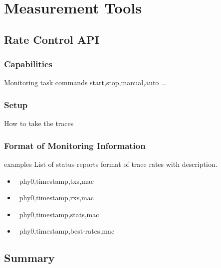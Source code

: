 \chapter{Measurement Tools}
\label{sec:mmeasurement}

\section{Rate Control API}
\label{sec:measurement:current}

\subsection{Capabilities}

Monitoring task commands  
start,stop,manual,auto ...
\label{sec:measurementg:validation}
\subsection{Setup}
How to take the traces
\subsection{Format of Monitoring Information}
\begin{sloppypar}
examples
% 
List of status reports
% 
format of trace rates with description.
% 
\begin{itemize}
\item \ phy0,timestamp,txs,mac
\item \ phy0,timestamp,rxs,mac
\item \ phy0,timestamp,stats,mac
\item \ phy0,timestamp,best-rates,mac
\end{itemize}
\end{sloppypar}



\section{Summary}


